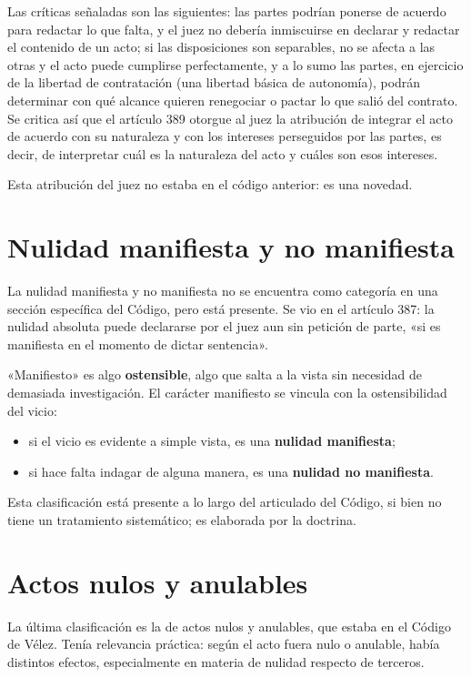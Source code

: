 \documentclass[12pt,oneside]{book}
\begin{document}
Las críticas señaladas son las siguientes: las partes podrían ponerse de acuerdo para redactar lo que falta, y el juez no debería inmiscuirse en declarar y redactar el contenido de un acto; si las disposiciones son separables, no se afecta a las otras y el acto puede cumplirse perfectamente, y a lo sumo las partes, en ejercicio de la libertad de contratación (una libertad básica de autonomía), podrán determinar con qué alcance quieren renegociar o pactar lo que salió del contrato. Se critica así que el artículo 389 otorgue al juez la atribución de integrar el acto de acuerdo con su naturaleza y con los intereses perseguidos por las partes, es decir, de interpretar cuál es la naturaleza del acto y cuáles son esos intereses.

Esta atribución del juez no estaba en el código anterior: es una novedad.

\section{Nulidad manifiesta y no manifiesta}

La nulidad manifiesta y no manifiesta no se encuentra como categoría en una sección específica del Código, pero está presente. Se vio en el artículo 387: la nulidad absoluta puede declararse por el juez aun sin petición de parte, «si es manifiesta en el momento de dictar sentencia».

«Manifiesto» es algo \textbf{ostensible}, algo que salta a la vista sin necesidad de demasiada investigación. El carácter manifiesto se vincula con la ostensibilidad del vicio:

\begin{itemize}
    \item si el vicio es evidente a simple vista, es una \textbf{nulidad manifiesta};
    \item si hace falta indagar de alguna manera, es una \textbf{nulidad no manifiesta}.
\end{itemize}

Esta clasificación está presente a lo largo del articulado del Código, si bien no tiene un tratamiento sistemático; es elaborada por la doctrina.

\section{Actos nulos y anulables}
\label{sec:nulosanulables}

La última clasificación es la de actos nulos y anulables, que estaba en el Código de Vélez. Tenía relevancia práctica: según el acto fuera nulo o anulable, había distintos efectos, especialmente en materia de nulidad respecto de terceros.
\end{document}
